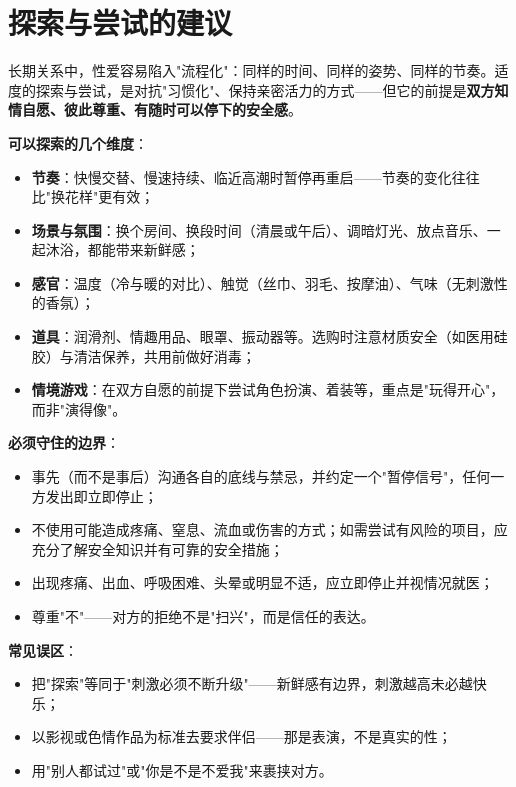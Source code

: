\documentclass[12pt,UTF8]{ctexbook}
\begin{document}
\vspace{0.5em}


\vspace{0.5em}
\section{探索与尝试的建议}

长期关系中，性爱容易陷入"流程化"：同样的时间、同样的姿势、同样的节奏。适度的探索与尝试，是对抗"习惯化"、保持亲密活力的方式——但它的前提是\textbf{双方知情自愿、彼此尊重、有随时可以停下的安全感}。

\noindent\textbf{可以探索的几个维度}：
\begin{itemize}
	\item \textbf{节奏}：快慢交替、慢速持续、临近高潮时暂停再重启——节奏的变化往往比"换花样"更有效；
	\item \textbf{场景与氛围}：换个房间、换段时间（清晨或午后）、调暗灯光、放点音乐、一起沐浴，都能带来新鲜感；
	\item \textbf{感官}：温度（冷与暖的对比）、触觉（丝巾、羽毛、按摩油）、气味（无刺激性的香氛）；
	\item \textbf{道具}：润滑剂、情趣用品、眼罩、振动器等。选购时注意材质安全（如医用硅胶）与清洁保养，共用前做好消毒；
	\item \textbf{情境游戏}：在双方自愿的前提下尝试角色扮演、着装等，重点是"玩得开心"，而非"演得像"。
\end{itemize}

\noindent\textbf{必须守住的边界}：
\begin{itemize}
	\item 事先（而不是事后）沟通各自的底线与禁忌，并约定一个"暂停信号"，任何一方发出即立即停止；
	\item 不使用可能造成疼痛、窒息、流血或伤害的方式；如需尝试有风险的项目，应充分了解安全知识并有可靠的安全措施；
	\item 出现疼痛、出血、呼吸困难、头晕或明显不适，应立即停止并视情况就医；
	\item 尊重"不"——对方的拒绝不是"扫兴"，而是信任的表达。
\end{itemize}

\noindent\textbf{常见误区}：
\begin{itemize}
	\item 把"探索"等同于"刺激必须不断升级"——新鲜感有边界，刺激越高未必越快乐；
	\item 以影视或色情作品为标准去要求伴侣——那是表演，不是真实的性；
	\item 用"别人都试过"或"你是不是不爱我"来裹挟对方。
\end{itemize}
\end{document}
